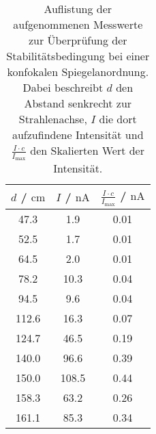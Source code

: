 \begin{table}
\centering
\caption{Auflistung der aufgenommenen Messwerte zur Überprüfung der
Stabilitätsbedingung bei einer konfokalen Spiegelanordnung. Dabei beschreibt
$d$ den Abstand senkrecht zur Strahlenachse, $I$ die dort aufzufindene Intensität
und $\frac{I \cdot c}{I_\text{max}}$ den Skalierten Wert der Intensität.}
\label{tab:kk}

\begin{tabular}{ccc}
\toprule
$d$ / $\si{\centi\meter}$ & $I$ / $\si{\nano\ampere}$ & $\frac{I \cdot c}{I_\text{max}}$ / $\si{\nano\ampere}$\\
\midrule
47.3 & 1.9 & 0.01 \\
52.5 & 1.7 & 0.01 \\
64.5 & 2.0 & 0.01 \\
78.2 & 10.3 & 0.04 \\
94.5 & 9.6 & 0.04 \\
112.6 & 16.3 & 0.07 \\
124.7 & 46.5 & 0.19 \\
140.0 & 96.6 & 0.39 \\
150.0 & 108.5 & 0.44 \\
158.3 & 63.2 & 0.26 \\
161.1 & 85.3 & 0.34 \\
\bottomrule
\end{tabular}
\end{table}
